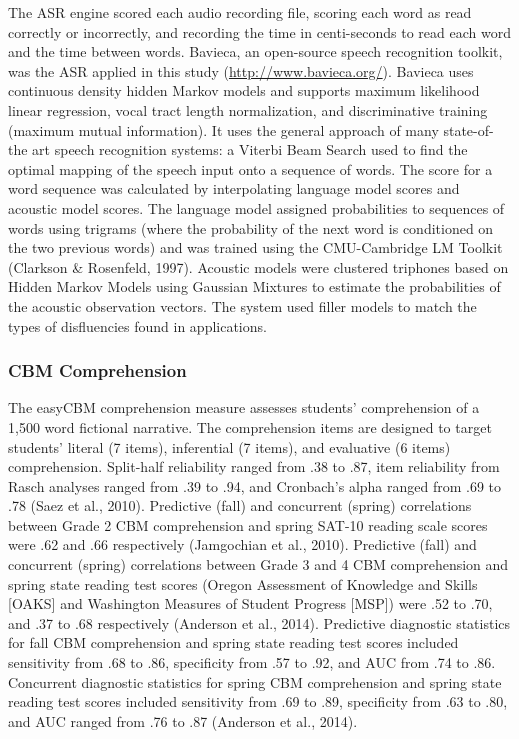 \documentclass[
  english,
  man, fleqn, noextraspace]{apa6}
\begin{document}
The ASR engine scored each audio recording file, scoring each word as read correctly or incorrectly, and recording the time in centi-seconds to read each word and the time between words. Bavieca, an open-source speech recognition toolkit, was the ASR applied in this study (\url{http://www.bavieca.org/}). Bavieca uses continuous density hidden Markov models and supports maximum likelihood linear regression, vocal tract length normalization, and discriminative training (maximum mutual information). It uses the general approach of many state-of-the art speech recognition systems: a Viterbi Beam Search used to find the optimal mapping of the speech input onto a sequence of words. The score for a word sequence was calculated by interpolating language model scores and acoustic model scores. The language model assigned probabilities to sequences of words using trigrams (where the probability of the next word is conditioned on the two previous words) and was trained using the CMU-Cambridge LM Toolkit (Clarkson \& Rosenfeld, 1997). Acoustic models were clustered triphones based on Hidden Markov Models using Gaussian Mixtures to estimate the probabilities of the acoustic observation vectors. The system used filler models to match the types of disfluencies found in applications.

\hypertarget{cbm-comprehension}{%
\subsubsection{CBM Comprehension}\label{cbm-comprehension}}

The easyCBM comprehension measure assesses students' comprehension of a 1,500 word fictional narrative. The comprehension items are designed to target students' literal (7 items), inferential (7 items), and evaluative (6 items) comprehension. Split-half reliability ranged from .38 to .87, item reliability from Rasch analyses ranged from .39 to .94, and Cronbach's alpha ranged from .69 to .78 (Saez et al., 2010). Predictive (fall) and concurrent (spring) correlations between Grade 2 CBM comprehension and spring SAT-10 reading scale scores were .62 and .66 respectively (Jamgochian et al., 2010). Predictive (fall) and concurrent (spring) correlations between Grade 3 and 4 CBM comprehension and spring state reading test scores (Oregon Assessment of Knowledge and Skills {[}OAKS{]} and Washington Measures of Student Progress {[}MSP{]}) were .52 to .70, and .37 to .68 respectively (Anderson et al., 2014). Predictive diagnostic statistics for fall CBM comprehension and spring state reading test scores included sensitivity from .68 to .86, specificity from .57 to .92, and AUC from .74 to .86. Concurrent diagnostic statistics for spring CBM comprehension and spring state reading test scores included sensitivity from .69 to .89, specificity from .63 to .80, and AUC ranged from .76 to .87 (Anderson et al., 2014).
\end{document}
